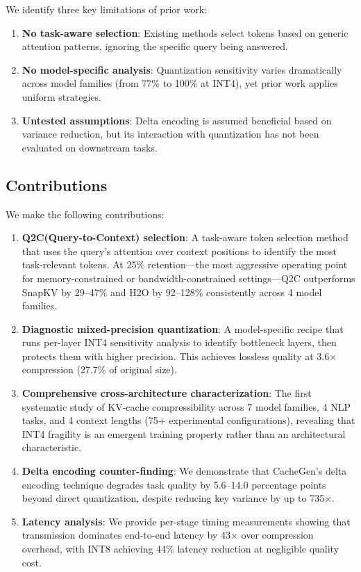 \documentclass[conference]{IEEEtran}
\newcommand{\QtoC}{\textsc{Q2C}\xspace}
\begin{document}
We identify three key limitations of prior work:
\begin{enumerate}
    \item \textbf{No task-aware selection}: Existing methods select tokens based on generic attention patterns, ignoring the specific query being answered.
    \item \textbf{No model-specific analysis}: Quantization sensitivity varies dramatically across model families (from 77\% to 100\% at INT4), yet prior work applies uniform strategies.
    \item \textbf{Untested assumptions}: Delta encoding is assumed beneficial based on variance reduction, but its interaction with quantization has not been evaluated on downstream tasks.
\end{enumerate}

\subsection{Contributions}

We make the following contributions:

\begin{enumerate}
    \item \textbf{\QtoC (Query-to-Context) selection}: A task-aware token selection method that uses the query's attention over context positions to identify the most task-relevant tokens. At 25\% retention---the most aggressive operating point for memory-constrained or bandwidth-constrained settings---\QtoC outperforms SnapKV by 29--47\% and H2O by 92--128\% consistently across 4 model families.

    \item \textbf{Diagnostic mixed-precision quantization}: A model-specific recipe that runs per-layer INT4 sensitivity analysis to identify bottleneck layers, then protects them with higher precision. This achieves lossless quality at 3.6$\times$ compression (27.7\% of original size).

    \item \textbf{Comprehensive cross-architecture characterization}: The first systematic study of KV-cache compressibility across 7 model families, 4 NLP tasks, and 4 context lengths (75+ experimental configurations), revealing that INT4 fragility is an emergent training property rather than an architectural characteristic.

    \item \textbf{Delta encoding counter-finding}: We demonstrate that CacheGen's delta encoding technique degrades task quality by 5.6--14.0 percentage points beyond direct quantization, despite reducing key variance by up to 735$\times$.

    \item \textbf{Latency analysis}: We provide per-stage timing measurements showing that transmission dominates end-to-end latency by 43$\times$ over compression overhead, with INT8 achieving 44\% latency reduction at negligible quality cost.
\end{enumerate}
\end{document}
